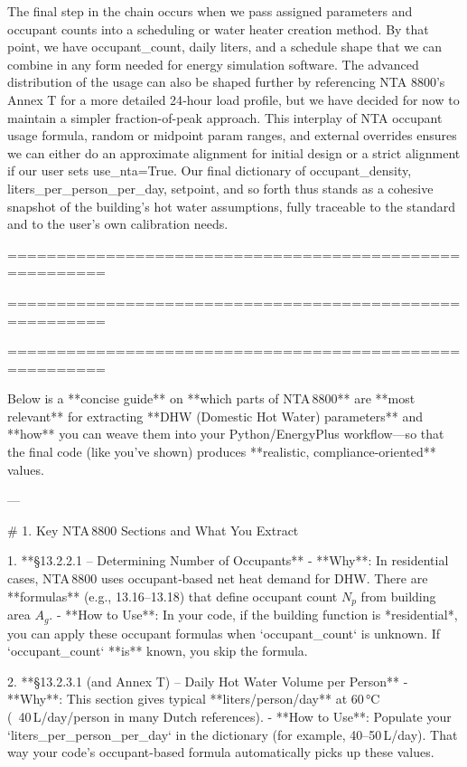 The final step in the chain occurs when we pass assigned parameters and occupant counts into a scheduling or water heater creation method. By that point, we have occupant_count, daily liters, and a schedule shape that we can combine in any form needed for energy simulation software. The advanced distribution of the usage can also be shaped further by referencing NTA 8800’s Annex T for a more detailed 24‐hour load profile, but we have decided for now to maintain a simpler fraction-of-peak approach. This interplay of NTA occupant usage formula, random or midpoint param ranges, and external overrides ensures we can either do an approximate alignment for initial design or a strict alignment if our user sets use_nta=True. Our final dictionary of occupant_density, liters_per_person_per_day, setpoint, and so forth thus stands as a cohesive snapshot of the building’s hot water assumptions, fully traceable to the standard and to the user’s own calibration needs.









========================================================

========================================================

========================================================







Below is a **concise guide** on **which parts of NTA 8800** are **most relevant** for extracting **DHW (Domestic Hot Water) parameters** and **how** you can weave them into your Python/EnergyPlus workflow—so that the final code (like you’ve shown) produces **realistic, compliance-oriented** values. 

---

# 1. Key NTA 8800 Sections and What You Extract

1. **\S13.2.2.1 – Determining Number of Occupants**  
   - **Why**: In residential cases, NTA 8800 uses occupant‐based net heat demand for DHW. There are **formulas** (e.g., 13.16–13.18) that define occupant count \( N_{p} \) from building area \( A_{g} \).  
   - **How to Use**: In your code, if the building function is *residential*, you can apply these occupant formulas when `occupant_count` is unknown. If `occupant_count` **is** known, you skip the formula.

2. **\S13.2.3.1 (and Annex T) – Daily Hot Water Volume per Person**  
   - **Why**: This section gives typical **liters/person/day** at 60 °C (~40 L/day/person in many Dutch references).  
   - **How to Use**: Populate your `liters_per_person_per_day` in the dictionary (for example, 40–50 L/day). That way your code’s occupant-based formula automatically picks up these values.

